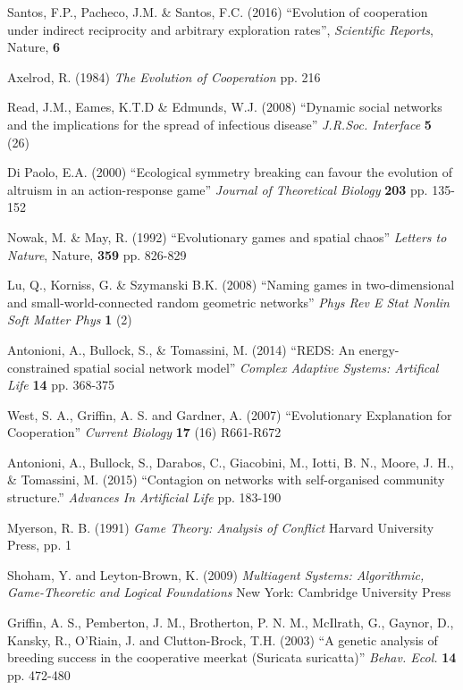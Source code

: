 \documentclass[a4paper, 12pt, notitlepage]{report}
\numberwithin{equation}{subsection}
\theoremstyle{definition}
\theoremstyle{theorem}
\theoremstyle{definition}
\begin{document}
\begin{thebibliography}{9}

Santos, F.P., Pacheco, J.M. \& Santos, F.C. (2016) ``Evolution of cooperation under indirect reciprocity and arbitrary exploration rates'', \emph{Scientific Reports}, Nature, \textbf{6}

Axelrod, R. (1984) \emph{The Evolution of Cooperation} pp. 216

Read, J.M., Eames, K.T.D \& Edmunds, W.J. (2008) ``Dynamic social networks and the implications for the spread of infectious disease'' \emph{J.R.Soc. Interface} \textbf{5} (26)

Di Paolo, E.A. (2000) ``Ecological symmetry breaking can favour the evolution of altruism in an action-response game'' \emph{Journal of Theoretical Biology} \textbf{203} pp. 135-152

 Nowak, M. \& May, R. (1992) ``Evolutionary games and spatial chaos'' \emph{Letters to Nature}, Nature, \textbf{359} pp. 826-829

Lu, Q., Korniss, G. \& Szymanski B.K. (2008) ``Naming games in two-dimensional and small-world-connected random geometric networks'' \emph{Phys Rev E Stat Nonlin Soft Matter Phys} \textbf{1} (2)

Antonioni, A., Bullock, S., \& Tomassini, M. (2014) ``REDS: An energy-constrained spatial social network model'' \emph{Complex Adaptive Systems: Artifical Life} \textbf{14} pp. 368-375

West, S. A., Griffin, A. S. and Gardner, A. (2007) ``Evolutionary Explanation for Cooperation'' \emph{Current Biology} \textbf{17} (16) R661-R672

Antonioni, A., Bullock, S., Darabos, C., Giacobini, M., Iotti, B. N., Moore, J. H., \& Tomassini, M. (2015) ``Contagion on networks with self-organised community structure.'' \emph{Advances In Artificial Life} pp. 183-190

Myerson, R. B. (1991) \emph{Game Theory: Analysis of Conflict} Harvard University Press, pp. 1

Shoham, Y. and Leyton-Brown, K. (2009) \emph{Multiagent Systems: Algorithmic, Game-Theoretic and Logical Foundations} New York: Cambridge University Press

Griffin, A. S., Pemberton, J. M., Brotherton, P. N. M., McIlrath, G., Gaynor, D., Kansky, R., O'Riain, J. and Clutton-Brock, T.H. (2003) ``A genetic analysis of breeding success in the cooperative meerkat (Suricata suricatta)'' \emph{Behav. Ecol.} \textbf{14} pp. 472-480


\end{thebibliography}
\end{document}
